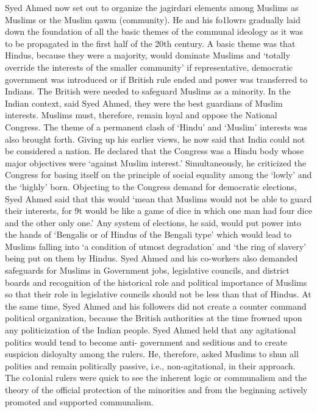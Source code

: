 Syed Ahmed now set out to organize the jagirdari elements among Muslims as Muslims or the Muslim qawm (community). He and his fo1lowrs gradually laid down the foundation of all the basic themes of the communal ideology as it was to be propagated in the first half of the 20th century. A basic theme was that Hindus, because they were a majority, would dominate Muslims and ‘totally override the interests of the smaller community’ if representative, democratic government was introduced or if British rule ended and power was transferred to Indians. The British were needed to safeguard Muslims as a minority. In the Indian context, said Syed Ahmed, they were the best guardians of Muslim interests. Muslims must, therefore, remain loyal and oppose the National Congress. The theme of a permanent clash of ‘Hindu’ and ‘Muslim’ interests was also brought forth. Giving up his earlier views, he now said that India could not be considered a nation. He declared that the Congress was a Hindu body whose major objectives were ‘against Muslim interest.’ Simultaneously, he criticized the Congress for basing itself on the principle of social equality among the ‘lowly’ and the ‘highly’ born. Objecting to the Congress demand for democratic elections, Syed Ahmed said that this would ‘mean that Muslims would not be able to guard their interests, for 9t would be like a game of dice in which one man had four dice and the other only one.’ Any system of elections, he said, would put power into the hands of ‘Bengalis or of Hindus of the Bengali type’ which would lead to Muslims falling into ‘a condition of utmost degradation’ and ‘the ring of slavery’ being put on them by Hindus. Syed Ahmed and his co-workers also demanded safeguards for Muslims in Government jobs, legislative councils, and district boards and recognition of the historical role and political importance of Muslims so that their role in legislative councils should not be less than that of Hindus. At the same time, Syed Ahmed and his followers did not create a counter command political organization, because the British authorities at the time frowned upon any politicization of the Indian people. Syed Ahmed held that any agitational politics would tend to become anti- government and seditious and to create suspicion disloyalty among the rulers. He, therefore, asked Muslims to shun all polities and remain politically passive, i.e., non-agitational, in their approach. The co1onial rulers were quick to see the inherent logic or communalism and the theory of the official protection of the minorities and from the beginning actively promoted and supported communalism. 

